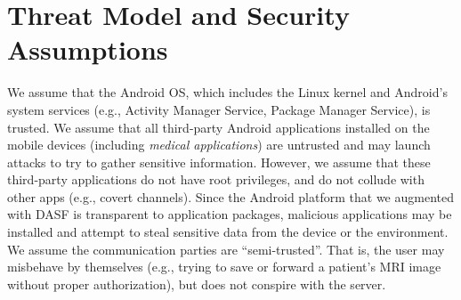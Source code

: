 \section{Threat Model and Security Assumptions}
\begin{comment}
This work focuses on the security challenges of enforcing security
policies on sensitive data sent to Android-based mobile devices and
enforcing dynamic privilege restrictions.
Thus, the security policies of the server and database management
system are out of scope of this study. And we assume that the data is
protected in the server (or cloud) and the database management system
by the appropriate security measures. Furthermore, we assume that the
server ensures that the communication channel between the server and
the application running on the mobile device is secure (e.g., SSL) and
each individual involved in the communication has his/her security
credentials (including digital certificates, public and private key,
etc.) distributed through an out-of-band security channel.  
\end{comment}
We assume that the Android OS, which includes the Linux kernel and Android's
system services (e.g., Activity Manager Service, Package Manager Service), is
trusted.
We assume that all third-party Android applications installed on the mobile
devices (including \textit{medical applications}) are untrusted and may launch
attacks to try to gather sensitive information. However, we assume that these
third-party applications do not have root privileges, and do not collude with
other apps (e.g., covert channels).  Since the Android platform that we
augmented with DASF is transparent to application packages, malicious
applications may be installed and attempt to steal sensitive data from the
device or the environment. We assume the communication parties are
“semi-trusted”. That is, the user may misbehave by themselves (e.g., trying to
save or forward a patient's MRI image without proper authorization), but does
not conspire with the server. 


